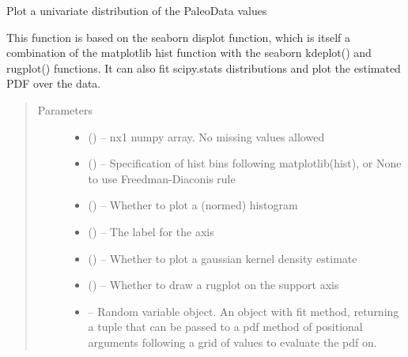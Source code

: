 \documentclass[letterpaper,10pt,english]{sphinxmanual}
\begin{document}
\begin{fulllineitems}
\label{\detokenize{Plot:pyleoclim.Plot.plot_hist}}
Plot a univariate distribution of the PaleoData values

This function is based on the seaborn displot function, which is
itself a combination of the matplotlib hist function with the
seaborn kdeplot() and rugplot() functions. It can also fit
scipy.stats distributions and plot the estimated PDF over the data.
\begin{quote}\begin{description}
\item[{Parameters}] \leavevmode\begin{itemize}
\item {} 
 () -- nx1 numpy array. No missing values allowed

\item {} 
 () -- Specification of hist bins following matplotlib(hist),
or None to use Freedman-Diaconis rule

\item {} 
 () -- Whether to plot a (normed) histogram

\item {} 
 () -- The label for the axis

\item {} 
 () -- Whether to plot a gaussian kernel density estimate

\item {} 
 () -- Whether to draw a rugplot on the support axis

\item {} 
 -- Random variable object. An object with fit method, returning
a tuple that can be passed to a pdf method of positional
arguments following a grid of values to evaluate the pdf on.


\end{itemize}
\end{description}
\end{quote}
\end{fulllineitems}
\end{document}
